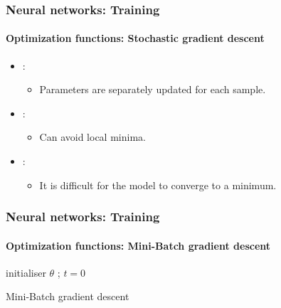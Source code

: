 \documentclass[xcolor=table]{beamer}
\begin{document}
\begin{frame}
	\frametitle{Neural networks: Training}
	\framesubtitle{Optimization functions: Stochastic gradient descent}

\begin{itemize}
\item {}: 
\begin{itemize}
	\item Parameters are separately updated for each sample.
\end{itemize}
\item {}: 
\begin{itemize}
	\item Can avoid local minima.
\end{itemize}
\item {}: 
\begin{itemize}
	\item It is difficult for the model to converge to a minimum.
\end{itemize}
\end{itemize}

\end{frame}


\begin{frame}
	\frametitle{Neural networks: Training}
	\framesubtitle{Optimization functions: Mini-Batch gradient descent}

\begin{algorithm}[H]
	\KwResult{$ \theta $}
	initialiser $ \theta $ ; $ t = 0 $\;
	\caption{Mini-Batch gradient descent}
\end{algorithm}

\end{frame}
\end{document}
